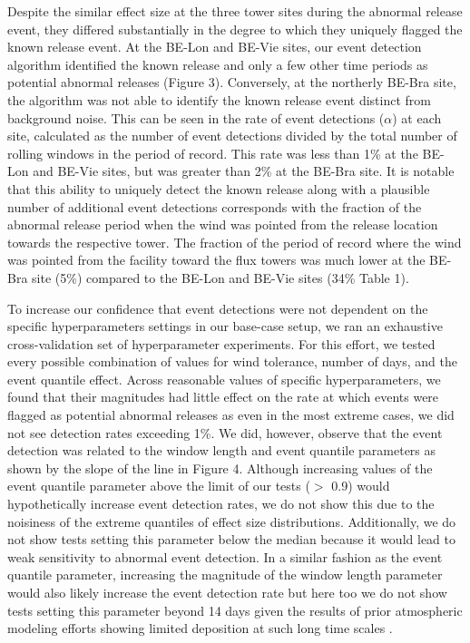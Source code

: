 \documentclass{article}
\begin{document}
Despite the similar effect size at the three tower sites during the abnormal release event, they differed substantially in the degree to which they uniquely flagged the known release event. At the BE-Lon and BE-Vie sites, our event detection algorithm identified the known release and only a few other time periods as potential abnormal releases (Figure 3). Conversely, at the northerly BE-Bra site, the algorithm was not able to identify the known release event distinct from background noise. This can be seen in the rate of event detections ($\alpha$) at each site, calculated as the number of event detections divided by the total number of rolling windows in the period of record. This rate was less than 1\% at the BE-Lon and BE-Vie sites, but was greater than 2\% at the BE-Bra site. It is notable that this ability to uniquely detect the known release along with a plausible number of additional event detections corresponds with the fraction of the abnormal release period when the wind was pointed from the release location towards the respective tower. The fraction of the period of record where the wind was pointed from the facility toward the flux towers was much lower at the BE-Bra site (5\%) compared to the BE-Lon and BE-Vie sites (34\% Table 1). 

To increase our confidence that event detections were not dependent on the specific hyperparameters settings in our base-case setup, we ran an exhaustive cross-validation set of hyperparameter experiments. For this effort, we tested every possible combination of values for wind tolerance, number of days, and the event quantile effect. Across reasonable values of specific hyperparameters, we found that their magnitudes had little effect on the rate at which events were flagged as potential abnormal releases as even in the most extreme cases, we did not see detection rates exceeding 1\%. We did, however, observe that the event detection was related to the window length and event quantile parameters as shown by the slope of the line in Figure 4. Although increasing values of the event quantile parameter above the limit of our tests ($>$ 0.9) would hypothetically increase event detection rates, we do not show this due to the noisiness of the extreme quantiles of effect size distributions. Additionally, we do not show tests setting this parameter below the median because it would lead to weak sensitivity to abnormal event detection. In a similar fashion as the event quantile parameter, increasing the magnitude of the window length parameter would also likely increase the event detection rate but here too we do not show tests setting this parameter beyond 14 days given the results of prior atmospheric modeling efforts showing limited deposition at such long time scales \citep[e.g.][]{meszarosPredictabilityDispersionFukushimaderived2016}.
\end{document}
